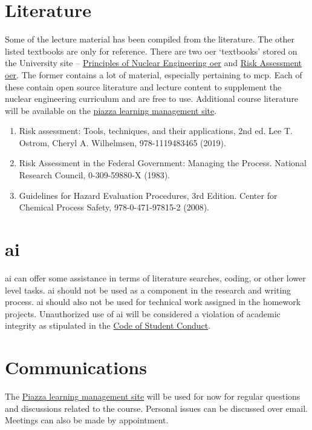 \documentclass[11pt,letterpaper]{article}
\newcommand{\acf}{\acrfull} %
\newcommand{\acl}{\acrlong} %
\newcommand{\acs}{\acrshort} %
\begin{document}
\section{Literature} 
Some of the lecture material has been compiled from the literature. The other listed textbooks are only for reference. There are two \acf{oer} `textbooks' stored on the University site -- \href{https://uidaho.pressbooks.pub/nuclearengineering/}{Principles of Nuclear Engineering \acs{oer}} and \href{https://uidaho.pressbooks.pub/riskassessment/}{Risk Assessment \acs{oer}}. The former contains a lot of material, especially pertaining to \acs{mcp}. Each of these contain open source literature and lecture content to supplement the nuclear engineering curriculum and are free to use. Additional course literature will be available on the \href{https://piazza.com/}{piazza learning management site}. 
\begin{enumerate}[item-label=(\arabic*)]
    \item Risk assessment: Tools, techniques, and their applications, 2nd ed. Lee T. Ostrom, Cheryl A. Wilhelmsen, 978-1119483465 (2019).
    \item Risk Assessment in the Federal Government: Managing the Process. National Research Council, 0-309-59880-X (1983).
    \item Guidelines for Hazard Evaluation Procedures, 3rd Edition. Center for Chemical Process Safety, 978-0-471-97815-2 (2008). 
\end{enumerate}


\section{\acl{ai}}
\acs{ai} can offer some assistance in terms of literature searches, coding, or other lower level tasks. \acs{ai} should not be used as a component in the research and writing process. \acs{ai} should also not be used for technical work assigned in the homework projects. Unauthorized use of \acs{ai} will be considered a violation of academic integrity as stipulated in the \href{http://www.uidaho.edu/student-affairs/dean-of-students/student-conduct/student-code-of-conduct}{Code of Student Conduct}.


\section{Communications}
The \href{https://piazza.com/}{Piazza learning management site} will be used for now for regular questions and discussions related to the course. Personal issues can be discussed over email. Meetings can also be made by appointment. 
\end{document}
